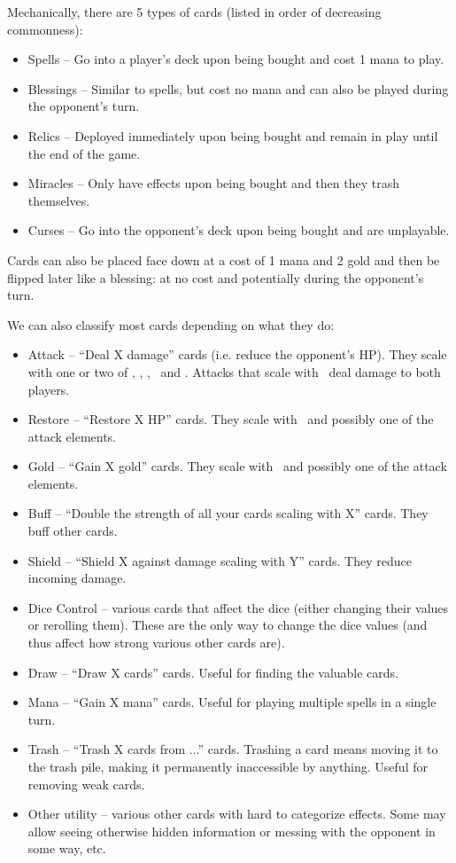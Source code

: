 \documentclass[dvipsnames,parskip,a4paper]{scrartcl}
\begin{document}
Mechanically, there are 5 types of cards (listed in order of decreasing commonness):

\begin{itemize}
\item Spells -- Go into a player's deck upon being bought and cost 1 mana to play.
\item Blessings -- Similar to spells, but cost no mana and can also be played during the opponent's turn.
\item Relics -- Deployed immediately upon being bought and remain in play until the end of the game.
\item Miracles -- Only have effects upon being bought and then they trash themselves.
\item Curses -- Go into the opponent's deck upon being bought and are unplayable.
\end{itemize}

Cards can also be placed face down at a cost of 1 mana and 2 gold and then be flipped later like a blessing: at no cost and potentially during the opponent's turn.

\vspace{4pt}

We can also classify most cards depending on what they do:

\begin{itemize}
\item Attack -- ``Deal X damage'' cards (i.e. reduce the opponent's HP). They scale with one or two of \chance, \fire, \earth, \water \ and \magic. Attacks that scale with \water \ deal damage to both players.
\item Restore -- ``Restore X HP'' cards. They scale with \nature \ and possibly one of the attack elements.
\item Gold -- ``Gain X gold'' cards. They scale with \gold \ and possibly one of the attack elements.
\item Buff -- ``Double the strength of all your cards scaling with X'' cards. They buff other cards.
\item Shield -- ``Shield X against damage scaling with Y'' cards. They reduce incoming damage.
\item Dice Control -- various cards that affect the dice (either changing their values or rerolling them). These are the only way to change the dice values (and thus affect how strong various other cards are).
\item Draw -- ``Draw X cards'' cards. Useful for finding the valuable cards.
\item Mana -- ``Gain X mana'' cards. Useful for playing multiple spells in a single turn.
\item Trash -- ``Trash X cards from ...'' cards. Trashing a card means moving it to the trash pile, making it permanently inaccessible by anything. Useful for removing weak cards.
\item Other utility -- various other cards with hard to categorize effects. Some may allow seeing otherwise hidden information or messing with the opponent in some way, etc.
\end{itemize}
\end{document}
